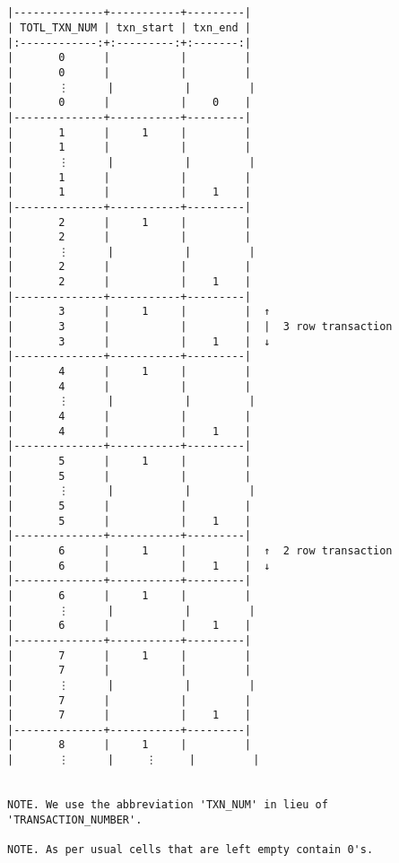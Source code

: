 \documentclass[varwidth=\maxdimen,margin=0.5cm,multi={verbatim}]{standalone}
\begin{document}
\begin{verbatim}


|--------------+-----------+---------|
| TOTL_TXN_NUM | txn_start | txn_end |
|:------------:+:---------:+:-------:|
|       0      |           |         |
|       0      |           |         |
|       ⋮      |           |         |
|       0      |           |    0    |
|--------------+-----------+---------|
|       1      |     1     |         |
|       1      |           |         |
|       ⋮      |           |         |
|       1      |           |         |
|       1      |           |    1    |
|--------------+-----------+---------|
|       2      |     1     |         |
|       2      |           |         |
|       ⋮      |           |         |
|       2      |           |         |
|       2      |           |    1    |
|--------------+-----------+---------|
|       3      |     1     |         |  ↑
|       3      |           |         |  |  3 row transaction
|       3      |           |    1    |  ↓
|--------------+-----------+---------|
|       4      |     1     |         |
|       4      |           |         |
|       ⋮      |           |         |
|       4      |           |         |
|       4      |           |    1    |
|--------------+-----------+---------|
|       5      |     1     |         |
|       5      |           |         |
|       ⋮      |           |         |
|       5      |           |         |
|       5      |           |    1    |
|--------------+-----------+---------|
|       6      |     1     |         |  ↑  2 row transaction
|       6      |           |    1    |  ↓
|--------------+-----------+---------|  
|       6      |     1     |         |
|       ⋮      |           |         |
|       6      |           |    1    |
|--------------+-----------+---------|
|       7      |     1     |         |
|       7      |           |         |
|       ⋮      |           |         |
|       7      |           |         |
|       7      |           |    1    |
|--------------+-----------+---------|
|       8      |     1     |         |
|       ⋮      |     ⋮     |         |


NOTE. We use the abbreviation 'TXN_NUM' in lieu of 'TRANSACTION_NUMBER'.

NOTE. As per usual cells that are left empty contain 0's.

\end{verbatim}
\end{document}
